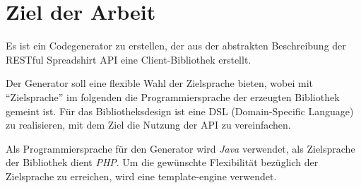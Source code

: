 \section{Ziel der Arbeit}

Es ist ein Codegenerator zu erstellen, der aus der abstrakten Beschreibung der \gls{RESTful} Spreadshirt \gls{API} eine Client-Bibliothek erstellt. 

Der Generator soll eine flexible Wahl der Zielsprache bieten, wobei mit \enquote{Zielsprache} im folgenden die Programmiersprache der erzeugten Bibliothek gemeint ist. 
Für das Bibliotheksdesign ist eine \gls{DSL} (Domain-Specific Language) zu realisieren, mit dem Ziel die Nutzung der \gls{API} zu vereinfachen. 

Als Programmiersprache für den Generator wird \emph{Java} verwendet, als Zielsprache der Bibliothek dient \emph{PHP}. Um die gewünschte Flexibilität bezüglich der Zielsprache zu erreichen, wird eine \gls{template-engine} verwendet.

